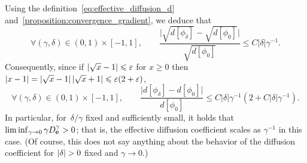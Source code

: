 \documentclass[11pt,a4paper]{article}
\begin{document}
\begin{remark}
Using the definition~\eqref{eq:effective_diffusion_d} and~\cref{proposition:convergence_gradient},
we deduce that
\[
    \forall (\gamma, \delta) \in (0, 1) \times [-1, 1], \qquad
    \frac{ \lvert \sqrt{d[\phi_{\delta}]} - \sqrt{d[\phi_{0}]} \rvert } {\sqrt{d[\phi_{0}]}}
    \leq C \lvert\delta\rvert \gamma^{-1}.
\]
Consequently,
since if $\abs{\sqrt{x} - 1} \leq \varepsilon$ for $x \geq 0$ then $\abs{x-1} = \abs{\sqrt{x} - 1} \abs{\sqrt{x} + 1} \leq \varepsilon (2 + \varepsilon)$,
\[
    \forall (\gamma, \delta) \in (0, 1) \times [-1, 1], \qquad
    \frac{ \lvert d[\phi_{\delta}] - d[\phi_{0}] \rvert } {d[\phi_{0}]}
    \leq  C \lvert\delta\rvert \gamma^{-1} (2 + C \lvert\delta\rvert \gamma^{-1}).
\]
In particular, for~$\delta/\gamma$ fixed and sufficiently small,
it holds that $\liminf_{\gamma \to 0} \gamma D^{\gamma}_{\boldsymbol{\mathbf e}} > 0$;
that is, the effective diffusion coefficient scales as $\gamma^{-1}$ in this case.
(Of course, this does not say anything about the behavior of the diffusion coefficient for $\abs{\delta} > 0$ fixed and $\gamma \to 0$.)
\end{remark}
\end{document}
